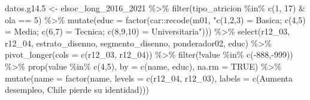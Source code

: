 \documentclass[
  12pt,
]{book}
\newenvironment{Shaded}{\begin{snugshade}}{\end{snugshade}}
\newcommand{\AttributeTok}[1]{\textcolor[rgb]{0.77,0.63,0.00}{#1}}
\newcommand{\ConstantTok}[1]{\textcolor[rgb]{0.00,0.00,0.00}{#1}}
\newcommand{\DecValTok}[1]{\textcolor[rgb]{0.00,0.00,0.81}{#1}}
\newcommand{\FloatTok}[1]{\textcolor[rgb]{0.00,0.00,0.81}{#1}}
\newcommand{\FunctionTok}[1]{\textcolor[rgb]{0.00,0.00,0.00}{#1}}
\newcommand{\NormalTok}[1]{#1}
\newcommand{\OtherTok}[1]{\textcolor[rgb]{0.56,0.35,0.01}{#1}}
\newcommand{\SpecialCharTok}[1]{\textcolor[rgb]{0.00,0.00,0.00}{#1}}
\newcommand{\StringTok}[1]{\textcolor[rgb]{0.31,0.60,0.02}{#1}}
\begin{document}
\begin{Shaded}
\begin{Highlighting}[]
\NormalTok{datos.g14}\FloatTok{.5} \OtherTok{\textless{}{-}}\NormalTok{ elsoc\_long\_2016\_2021 }\SpecialCharTok{\%\textgreater{}\%}
  \FunctionTok{filter}\NormalTok{(tipo\_atricion }\SpecialCharTok{\%in\%} \FunctionTok{c}\NormalTok{(}\DecValTok{1}\NormalTok{, }\DecValTok{17}\NormalTok{) }\SpecialCharTok{\&}\NormalTok{ ola }\SpecialCharTok{==} \DecValTok{5}\NormalTok{) }\SpecialCharTok{\%\textgreater{}\%} 
  \FunctionTok{mutate}\NormalTok{(}\AttributeTok{educ =} \FunctionTok{factor}\NormalTok{(car}\SpecialCharTok{::}\FunctionTok{recode}\NormalTok{(m01, }\StringTok{"c(1,2,3) = \textquotesingle{}Basica\textquotesingle{}; c(4,5) = \textquotesingle{}Media\textquotesingle{}; c(6,7) = \textquotesingle{}Tecnica\textquotesingle{}; c(8,9,10) = \textquotesingle{}Universitaria\textquotesingle{}"}\NormalTok{))) }\SpecialCharTok{\%\textgreater{}\%} 
  \FunctionTok{select}\NormalTok{(r12\_03, r12\_04, estrato\_disenno, segmento\_disenno, ponderador02, educ) }\SpecialCharTok{\%\textgreater{}\%}
  \FunctionTok{pivot\_longer}\NormalTok{(}\AttributeTok{cols =} \FunctionTok{c}\NormalTok{(r12\_03, r12\_04)) }\SpecialCharTok{\%\textgreater{}\%} 
  \FunctionTok{filter}\NormalTok{(}\SpecialCharTok{!}\NormalTok{value }\SpecialCharTok{\%in\%} \FunctionTok{c}\NormalTok{(}\SpecialCharTok{{-}}\DecValTok{888}\NormalTok{,}\SpecialCharTok{{-}}\DecValTok{999}\NormalTok{)) }\SpecialCharTok{\%\textgreater{}\%} 
  \FunctionTok{prop}\NormalTok{(value }\SpecialCharTok{\%in\%} \FunctionTok{c}\NormalTok{(}\DecValTok{4}\NormalTok{,}\DecValTok{5}\NormalTok{), }\AttributeTok{by =} \FunctionTok{c}\NormalTok{(name, educ), }\AttributeTok{na.rm =} \ConstantTok{TRUE}\NormalTok{) }\SpecialCharTok{\%\textgreater{}\%} 
  \FunctionTok{mutate}\NormalTok{(}\AttributeTok{name =} \FunctionTok{factor}\NormalTok{(name, }\AttributeTok{levels =} \FunctionTok{c}\NormalTok{(}\StringTok{\textquotesingle{}r12\_04\textquotesingle{}}\NormalTok{, }\StringTok{\textquotesingle{}r12\_03\textquotesingle{}}\NormalTok{), }
                       \AttributeTok{labels =} \FunctionTok{c}\NormalTok{(}\StringTok{\textquotesingle{}Aumenta desempleo\textquotesingle{}}\NormalTok{, }\StringTok{\textquotesingle{}Chile pierde su identidad\textquotesingle{}}\NormalTok{)))}


\end{Highlighting}
\end{Shaded}
\end{document}
